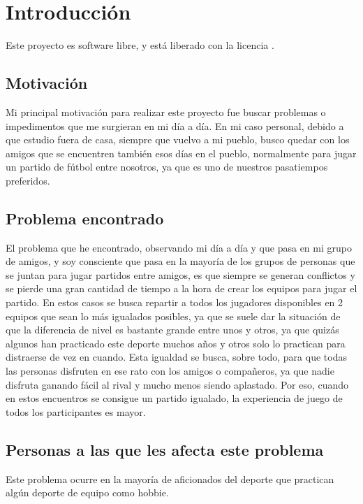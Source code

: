 \chapter{Introducción}

Este proyecto es software libre, y está liberado con la licencia \cite{gplv3}.

\section{Motivación}

Mi principal motivación para realizar este proyecto fue buscar problemas o impedimentos que me surgieran en mi día a día.
En mi caso personal, debido a que estudio fuera de casa, siempre que vuelvo a mi pueblo, busco quedar con los amigos que se encuentren también esos días en el pueblo, 
normalmente para jugar un partido de fútbol entre nosotros, ya que es uno de nuestros pasatiempos preferidos.\\

\section{Problema encontrado}

El problema que he encontrado, observando mi día a día y que pasa en mi grupo de amigos, y soy consciente que pasa en la mayoría de los grupos de personas que se juntan para jugar partidos entre amigos, 
es que siempre se generan conflictos y se pierde una gran cantidad de tiempo a la hora de crear los equipos para jugar el partido. 
En estos casos se busca repartir a todos los jugadores disponibles en 2 equipos que sean lo más igualados posibles, ya que se suele dar la situación de que la diferencia de nivel es bastante grande entre unos y otros,
ya que quizás algunos han practicado este deporte muchos años y otros solo lo practican para distraerse de vez en cuando.
Esta igualdad se busca, sobre todo, para que todas las personas disfruten en ese rato con los amigos o compañeros, ya que nadie disfruta ganando fácil al rival y mucho menos siendo aplastado. Por eso, cuando en estos encuentros se consigue
un partido igualado, la experiencia de juego de todos los participantes es mayor. 

\section{Personas a las que les afecta este problema}

Este problema ocurre en la mayoría de aficionados del deporte que practican algún deporte de equipo como hobbie.


